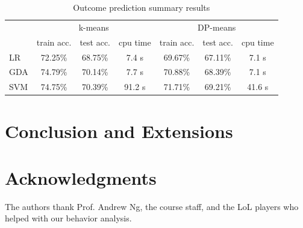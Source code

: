 \documentclass[letterpaper,10 pt,conference]{ieeeconf}
\begin{document}
\begin{table}[htbp!]
  \centering
  \caption{Outcome prediction summary results}
  \begin{tabular}{lcccccc}
    \toprule
    & \multicolumn{3}{c}{k-means} & \multicolumn{3}{c}{DP-means} \\
    & train acc. & test acc. & cpu time & train acc. & test acc. & cpu time \\ \midrule
    LR & 72.25\% & 68.75\% & 7.4 s & 69.67\% & 67.11\% & 7.1 s \\
    GDA & 74.79\% & 70.14\% & 7.7 s & 70.88\% & 68.39\% & 7.1 s \\
    SVM & 74.75\% & 70.39\% & 91.2 s & 71.71\% & 69.21\% & 41.6 s \\
    \bottomrule
  \end{tabular}
  \label{tab:pred}
\end{table}

\section{Conclusion and Extensions}



\section*{Acknowledgments}
The authors thank Prof. Andrew Ng, the course staff, and the LoL players who helped with our behavior analysis.


\end{document}

